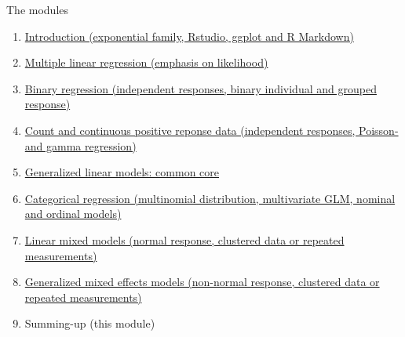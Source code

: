 \documentclass[ignorenonframetext,]{beamer}
\begin{document}
\begin{frame}

\begin{block}{The modules}

\begin{enumerate}
\def\labelenumi{\arabic{enumi}.}
\item
  \href{https://www.math.ntnu.no/emner/TMA4315/2018h/1Intro.html}{Introduction
  (exponential family, Rstudio, ggplot and R Markdown)}
\item
  \href{https://www.math.ntnu.no/emner/TMA4315/2018h/2MLR.html}{Multiple
  linear regression (emphasis on likelihood)}
\item
  \href{https://www.math.ntnu.no/emner/TMA4315/2018h/3BinReg.html}{Binary
  regression (independent responses, binary individual and grouped
  response)}
\item
  \href{https://www.math.ntnu.no/emner/TMA4315/2018h/4PoissonGamma.html}{Count
  and continuous positive reponse data (independent responses, Poisson-
  and gamma regression)}
\item
  \href{https://www.math.ntnu.no/emner/TMA4315/2018h/5GLM.html}{Generalized
  linear models: common core}
\item
  \href{https://www.math.ntnu.no/emner/TMA4315/2018h/6Categorical.html}{Categorical
  regression (multinomial distribution, multivariate GLM, nominal and
  ordinal models)}
\item
  \href{https://www.math.ntnu.no/emner/TMA4315/2018h/7LMM.html}{Linear
  mixed models (normal response, clustered data or repeated
  measurements)}
\item
  \href{https://www.math.ntnu.no/emner/TMA4315/2018h/8GLMM.html}{Generalized
  mixed effects models (non-normal response, clustered data or repeated
  measurements)}
\item
  Summing-up (this module)
\end{enumerate}

\end{block}

\end{frame}
\end{document}
